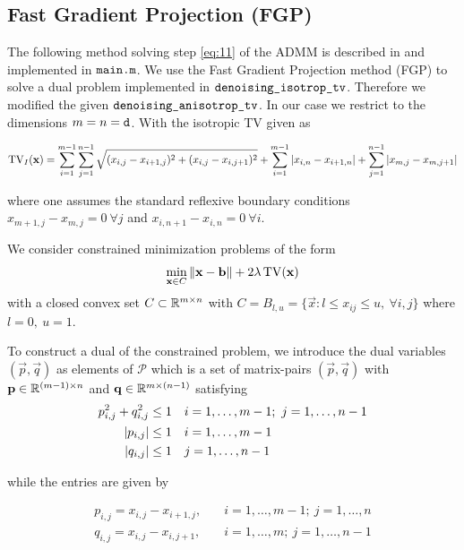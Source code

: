 \subsection{Fast Gradient Projection (FGP)} \label{subsec:FGP}
The following method solving step \ref{eq:11} of the ADMM is described in \cite{MR2049783} and implemented in $\texttt{main.m}$. We use the Fast Gradient Projection method (FGP) to solve a dual problem implemented in $\texttt{denoising\_isotrop\_tv}$. Therefore we modified the given $\texttt{denoising\_anisotrop\_tv}$. In our case we restrict to the dimensions $m = n = \texttt{d}$.
With the isotropic TV given as

\begin{equation}
\operatorname{TV}_I(\vb*{\vb{x}}) = \sum_{i=1}^{m-1} \sum_{j=1}^{n-1} \sqrt{(x_{i,j}-x_{i+1,j})^2 + (x_{i,j} - x_{i,j+1})^2} + \sum_{i=1}^{m-1} \abs{x_{i,n} - x_{i+1,n}} + \sum_{j=1}^{n-1} \abs{x_{m,j} - x_{m,j+1}}
\end{equation}

where one assumes the standard reflexive boundary conditions $x_{m+1,j} - x_{m,j} = 0 \ \forall j$ and $x_{i,n+1} - x_{i,n} = 0 \ \forall i$.

We consider constrained minimization problems of the form
\begin{equation} \label{eq:4.1}
    \min_{\vb*{\vb{x}} \in C} \left\lVert\vb*{\vb{x}}-\vb*{\vb{b}}\right\rVert + 2\lambda \operatorname{TV}(\vb*{\vb{x}})
\end{equation}
with a closed convex set $C \subset \mathbb{R}^{m \times n}$ with $C = B_{l,u} = \{\vec{x}: l \leq x_{ij} \leq u, \ \forall i,j\}$ where $l=0,\ u=1$.

To construct a dual of the constrained problem, we introduce the dual variables $(\vec{p},\vec{q})$ as elements of
$\mathcal{P}$ which is a set of matrix-pairs $(\vec{p},\vec{q})$ with $\vb*{\vb{p}} \in \mathbb{R}^{(m-1) \times n}$ and $\vb*{\vb{q}} \in \mathbb{R}^{m \times (n-1)}$ satisfying
\begin{align}
    p_{i,j}^2+q_{i,j}^2 &\leq 1\quad i=1,\ldots,m-1; \ j=1,\ldots,n-1\\
    \abs{p_{i,j}} &\leq 1\quad i=1,\ldots,m-1 \\
    \abs{q_{i,j}} &\leq 1\quad j=1,\ldots,n-1
\end{align}

while the entries are given by

\begin{align}
    p_{i,j} = x_{i,j} - x_{i+1,j}, \quad &i=1,\ldots,m-1; \ j=1,\ldots,n \\
    q_{i,j} = x_{i,j} - x_{i,j+1}, \quad &i=1,\ldots,m; \ j=1,\ldots,n-1
\end{align}

